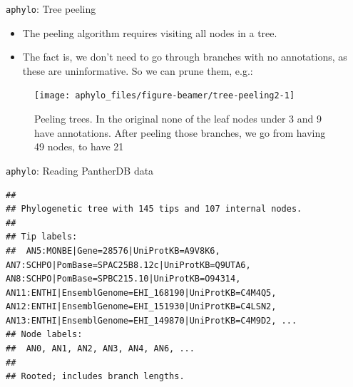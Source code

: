 \documentclass[9pt,ignorenonframetext,aspectratio=169]{beamer}
\newenvironment{Shaded}{\begin{snugshade}}{\end{snugshade}}
\newcommand{\KeywordTok}[1]{\textcolor[rgb]{0.94,0.87,0.69}{#1}}
\newcommand{\DataTypeTok}[1]{\textcolor[rgb]{0.87,0.87,0.75}{#1}}
\newcommand{\StringTok}[1]{\textcolor[rgb]{0.80,0.58,0.58}{#1}}
\newcommand{\CommentTok}[1]{\textcolor[rgb]{0.50,0.62,0.50}{#1}}
\newcommand{\OperatorTok}[1]{\textcolor[rgb]{0.94,0.94,0.82}{#1}}
\newcommand{\NormalTok}[1]{\textcolor[rgb]{0.80,0.80,0.80}{#1}}
\begin{document}
\begin{frame}[t]{\texttt{aphylo}: Tree peeling}

\begin{itemize}
\item
  The peeling algorithm requires visiting all nodes in a tree.\pause
\item
  The fact is, we don't need to go through branches with no annotations,
  as these are uninformative. \pause So we can prune them, e.g.:\pause
\end{itemize}

\footnotesize

\normalsize

\footnotesize

\begin{figure}

{\centering \texttt{[image: aphylo\_files/figure-beamer/tree-peeling2-1]} 

}

\caption{Peeling trees. In the original none of the leaf nodes under 3 and 9 have annotations. After peeling those branches, we go from having 49  nodes, to have 21}\label{fig:tree-peeling2}
\end{figure}

\normalsize

\end{frame}

\begin{frame}[fragile]{\texttt{aphylo}: Reading PantherDB data}

\footnotesize

\begin{Shaded}
\end{Shaded}

\begin{verbatim}
## 
## Phylogenetic tree with 145 tips and 107 internal nodes.
## 
## Tip labels:
##  AN5:MONBE|Gene=28576|UniProtKB=A9V8K6, AN7:SCHPO|PomBase=SPAC25B8.12c|UniProtKB=Q9UTA6, AN8:SCHPO|PomBase=SPBC215.10|UniProtKB=O94314, AN11:ENTHI|EnsemblGenome=EHI_168190|UniProtKB=C4M4Q5, AN12:ENTHI|EnsemblGenome=EHI_151930|UniProtKB=C4LSN2, AN13:ENTHI|EnsemblGenome=EHI_149870|UniProtKB=C4M9D2, ...
## Node labels:
##  AN0, AN1, AN2, AN3, AN4, AN6, ...
## 
## Rooted; includes branch lengths.
\end{verbatim}

\normalsize

\end{frame}
\end{document}
